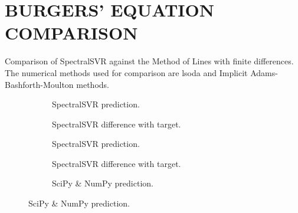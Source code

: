 \chapter{BURGERS' EQUATION COMPARISON}\label{sec:burgers_comparison}
Comparison of SpectralSVR against the Method of Lines with finite differences. The numerical methods used for comparison are lsoda and Implicit Adams-Bashforth-Moulton methods.
\begin{figure}[H]
  \centering
  \begin{adjustwidth}{-0.05\linewidth}{-0.05\linewidth}
    \begin{subfigure}{0.49\linewidth}
      \begin{adjustbox}{width=\linewidth}
        
      \end{adjustbox}
      \caption{SpectralSVR prediction.}\label{fig:comp_lssvr_pred_0.0}
    \end{subfigure}
    \begin{subfigure}{0.49\linewidth}
      \begin{adjustbox}{width=\linewidth}
        
      \end{adjustbox}
      \caption{SpectralSVR difference with target.}\label{fig:comp_lssvr_diff_0.0}
    \end{subfigure}
    \begin{subfigure}{0.49\linewidth}
      \begin{adjustbox}{width=\linewidth}
        
      \end{adjustbox}
      \caption{SpectralSVR prediction.}\label{fig:comp_fnn_pred_0.0}
    \end{subfigure}
    \begin{subfigure}{0.49\linewidth}
      \begin{adjustbox}{width=\linewidth}
        
      \end{adjustbox}
      \caption{SpectralSVR difference with target.}\label{fig:comp_fnn_diff_0.0}
    \end{subfigure}
    \begin{subfigure}{0.49\linewidth}
      \begin{adjustbox}{width=\linewidth}
        
      \end{adjustbox}
      \caption{SciPy \& NumPy prediction.}\label{fig:comp_spo_pred_0.0}

\end{subfigure}
\end{adjustwidth}
\end{figure}
